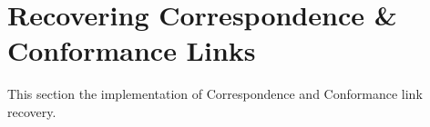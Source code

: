 \section{Recovering Correspondence \& Conformance Links}
\label{section:RecoveringCorrespondenceAndConformanceLinks}
This section the implementation of \gls{Correspondence} and \gls{Conformance} link recovery.


